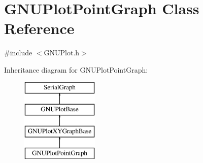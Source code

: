 \hypertarget{class_g_n_u_plot_point_graph}{}\section{G\+N\+U\+Plot\+Point\+Graph Class Reference}
\label{class_g_n_u_plot_point_graph}


{\ttfamily \#include $<$G\+N\+U\+Plot.\+h$>$}

Inheritance diagram for G\+N\+U\+Plot\+Point\+Graph\+:\begin{figure}[H]
\begin{center}
\leavevmode
\includegraphics[height=4.000000cm]{class_g_n_u_plot_point_graph}
\end{center}
\end{figure}
